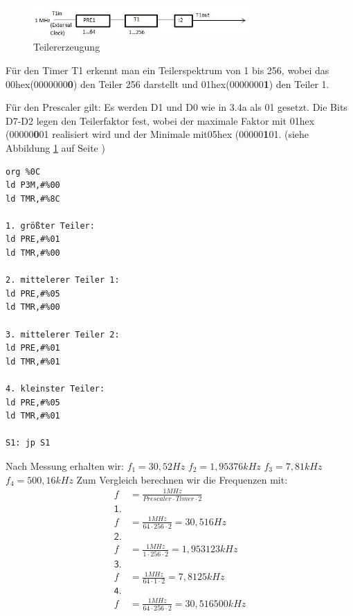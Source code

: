 \begin{figure}[!ht]
\begin{center}
\includegraphics[width=0.75\textwidth]{34bs} 
\caption{Teilererzeugung}
\label{34bs}
\end{center}
\end{figure}


Für den Timer T1 erkennt man ein Teilerspektrum von 1 bis 256, wobei das 00hex(0000000\textbf{0}) den Teiler 256 darstellt und 01hex(0000000\textbf{1}) den Teiler 1.

Für den Prescaler gilt:
Es werden D1 und D0 wie in 3.4a als 01 gesetzt.
Die Bits D7-D2 legen den Teilerfaktor fest, wobei der maximale Faktor mit 01hex (00000\textbf{0}01 realisiert wird und der Minimale mit05hex (00000\textbf{1}01.
(siehe Abbildung \ref{34bs} auf Seite \pageref{34bs})
\begin{verbatim}
org %0C
ld P3M,#%00
ld TMR,#%8C

1. größter Teiler: 
ld PRE,#%01
ld TMR,#%00

2. mittelerer Teiler 1:
ld PRE,#%05
ld TMR,#%00

3. mittelerer Teiler 2: 
ld PRE,#%01
ld TMR,#%01

4. kleinster Teiler: 
ld PRE,#%05
ld TMR,#%01

S1: jp S1
\end{verbatim}
Nach Messung erhalten wir: \newline
$f_1=30,52 Hz$\newline
$f_2=1,95376 kHz$\newline
$f_3=7,81 kHz$\newline
$f_4=500,16 kHz$\newline
Zum Vergleich berechnen wir die Frequenzen mit:
\begin{align}
f&=\frac{1 MHz}{Prescaler\cdot Timer \cdot 2} \\
\mathsf{1.}&\nonumber\\
f&=\frac{1 MHz}{64\cdot 256 \cdot 2}= 30,516 Hz\\
\mathsf{2.}&\nonumber\\
f&=\frac{1 MHz}{1\cdot 256 \cdot 2}= 1,953123 kHz\\
\mathsf{3.}&\nonumber\\
f&=\frac{1 MHz}{64\cdot 1 \cdot 2}= 7,8125 kHz \\
\mathsf{4.}&\nonumber\\
f&=\frac{1 MHz}{64\cdot 256 \cdot 2}= 30,516 500 kHz
\end{align}


